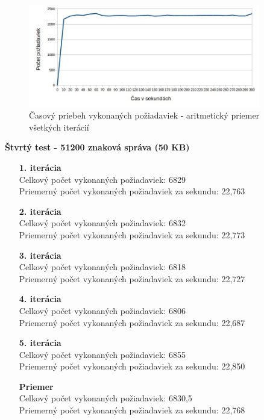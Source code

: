 \documentclass[12pt,oneside,final]{fithesis-utf8}
\begin{document}
\begin{itemize}
\begin{figure}[H]
  \centering
      \includegraphics[width=0.9\textwidth]{gatling3_3_distr.jpg}
  \caption{Časový priebeh vykonaných požiadaviek - aritmetický priemer všetkých iterácií}
\end{figure}

\textbf{Štvrtý test - 51200 znaková správa (50 KB)}
\begin{itemize}

\item[\textbf{1. iterácia}]\ \\
Celkový počet vykonaných požiadaviek: 6829\\
Priemerný počet vykonaných požiadaviek za sekundu: 22,763

\item[\textbf{2. iterácia}]\ \\
Celkový počet vykonaných požiadaviek: 6832\\
Priemerný počet vykonaných požiadaviek za sekundu: 22,773

\item[\textbf{3. iterácia}]\ \\
Celkový počet vykonaných požiadaviek: 6818\\
Priemerný počet vykonaných požiadaviek za sekundu: 22,727

\item[\textbf{4. iterácia}]\ \\
Celkový počet vykonaných požiadaviek: 6806\\
Priemerný počet vykonaných požiadaviek za sekundu: 22,687

\item[\textbf{5. iterácia}]\ \\
Celkový počet vykonaných požiadaviek: 6855\\
Priemerný počet vykonaných požiadaviek za sekundu: 22,850

\item[\textbf{Priemer}]\ \\
Celkový počet vykonaných požiadaviek: 6830,5\\
Priemerný počet vykonaných požiadaviek za sekundu: 22,768


\end{itemize}
\end{itemize}
\end{document}
